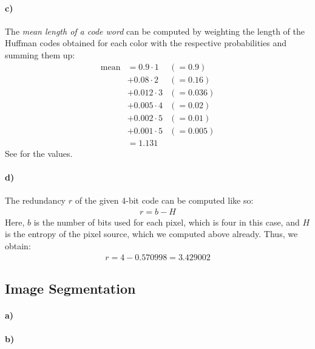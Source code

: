 \documentclass[a4paper,twocolumn]{article}
\begin{document}
	\paragraph{c)} %
	The \textit{mean length of a code word} can be computed by weighting the length of the Huffman codes obtained for each color with the respective probabilities and summing them up:
	\begin{align*}
	\text{mean} 
	&= 0.9 \cdot 1 	 &(=0.9) \\
	&+ 0.08 \cdot 2  &(=0.16) \\
	&+ 0.012 \cdot 3 &(=0.036) \\ 
	&+ 0.005 \cdot 4 &(=0.02) \\ 
	&+ 0.002 \cdot 5 &(=0.01) \\ 
	&+ 0.001 \cdot 5 &(=0.005) \\ 
	&= 1.131
	\end{align*}
	See  for the values.
	
	\paragraph{d)} %
	The redundancy $r$ of the given 4-bit code can be computed like so:
	\begin{align*}
	r = b - H
	\end{align*}
	Here, $b$ is the number of bits used for each pixel, which is four in this case, and $H$ is the entropy of the pixel source, which we computed above already. Thus, we obtain:
	\begin{align*}
		r = 4 - 0.570998 = 3.429002
	\end{align*}
	
	\subsection{Image Segmentation}
	
	\paragraph{a)} %
	
	
	\paragraph{b)} %
	
\end{document}
